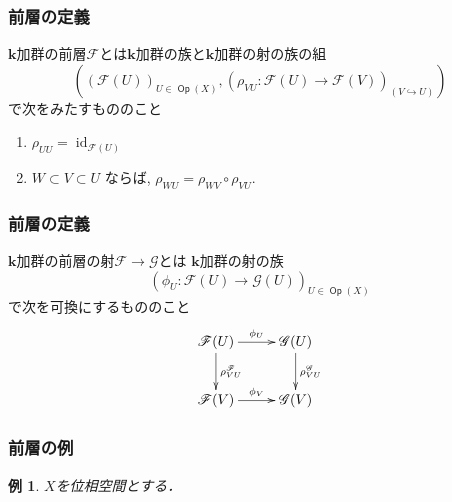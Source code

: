 \documentclass[dvipdfmx,12pt,aspectratio=169,leqno]{beamer}%
\newcommand{\kk}{\mathbf{k}}
\numberwithin{equation}{subsection}
\newcommand{\Op}{\mathop{\textsf{Op}}\nolimits}
\newcommand{\id}{\mathop{\mathrm{id}}\nolimits}
\theoremstyle{mystyle}
\newtheorem{EG}[AXM]{例}
\begin{document}
\begin{frame}
    \frametitle{前層の定義}

    \begin{definition}[前層]
        \(\kk\)加群の前層\(\mathscr{F}\)とは\(\kk\)加群の族と\(\kk\)加群の射の族の組\[\left(
        \left(\mathscr{F}(U)\right)_{U\in\Op(X)},
        \left(\rho_{VU}\colon\mathscr{F}(U)\to\mathscr{F}(V)\right)_{(V\hookrightarrow U)}
    \right)\]で次をみたすもののこと
    \begin{enumerate}
        \item $\rho_{UU} = \id_{\mathscr{F}(U)}$ 
        \item $W \subset V \subset U$ ならば, 
        $\rho_{WU} = \rho_{WV} \circ \rho_{VU}$.\label{enum:res}
    \end{enumerate}
    \end{definition}
\end{frame}
\begin{frame}
    \frametitle{前層の定義}

    \begin{definition}[前層の射]
        \(\kk\)加群の前層の射\(\mathscr{F}\to\mathscr{G}\)とは
        \(\kk\)加群の射の族\[
            (\phi_{U}\colon \mathscr{F}(U)
            \to \mathscr{G}(U))_{U\in\Op(X)}
        \]
        で次を可換にするもののこと
        \[\vcenter{\xymatrix@C=26pt@R=26pt{
            \mathscr{F}(U)
            \ar[r]^-{\phi_{U}}
            \ar[d]^-{\rho^{\mathscr{F}}_{VU}}
            &
            \mathscr{G}(U)
            \ar[d]^-{\rho^{\mathscr{G}}_{VU}} 
            \\
            \mathscr{F}(V)
            \ar[r]^-{\phi_{V}}
            &
            \mathscr{G}(V)
            }}
        \]
    \end{definition}
\end{frame}
\begin{frame}
    \frametitle{前層の例}
\begin{EG}
    \(X\)を位相空間とする．
\end{EG}
\end{frame}
\end{document}
